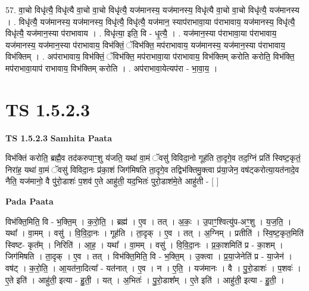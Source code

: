 \documentclass[17pt]{extarticle}
\begin{document}
57. वा॒चो विधृ॑त्यै॒ विधृ॑त्यै वा॒चो वा॒चो विधृ॑त्यै॒ यज॑मानस्य॒ यज॑मानस्य॒ विधृ॑त्यै वा॒चो वा॒चो विधृ॑त्यै॒ यज॑मानस्य । . विधृ॑त्यै॒ यज॑मानस्य॒ यज॑मानस्य॒ विधृ॑त्यै॒ विधृ॑त्यै॒ यज॑मान॒ स्याप॑राभावा॒या प॑राभावाय॒ यज॑मानस्य॒ विधृ॑त्यै॒ विधृ॑त्यै॒ यज॑मान॒स्या प॑राभावाय । . विधृ॑त्या॒ इति॒ वि - धृ॒त्यै॒ । . यज॑मान॒स्या प॑राभावा॒या प॑राभावाय॒ यज॑मानस्य॒ यज॑मान॒स्या प॑राभावाय॒ विभ॑क्तिं॒ ॅविभ॑क्ति॒ मप॑राभावाय॒ यज॑मानस्य॒ यज॑मान॒स्या प॑राभावाय॒ विभ॑क्तिम् । . अप॑राभावाय॒ विभ॑क्तिं॒ ॅविभ॑क्ति॒ मप॑राभावा॒या प॑राभावाय॒ विभ॑क्तिम् करोति करोति॒ विभ॑क्ति॒ मप॑राभावा॒याप॑ राभावाय॒ विभ॑क्तिम् करोति । . अप॑राभावा॒येत्यप॑रा - भा॒वा॒य॒ । \newline
\pagebreak
{}
\section*{ TS 1.5.2.3 }

\textbf{TS 1.5.2.3 } \newline
\textbf{Samhita Paata} \newline

विभ॑क्तिं करोति॒ ब्रह्मै॒व तद॑करुपाꣳ॒॒शु य॑जति॒ यथा॑ वा॒मं ॅवसु॑ विविदा॒नो गूह॑ति ता॒दृगे॒व तद॒ग्निं प्रति॑ स्विष्ट॒कृतं॒ निरा॑ह॒ यथा॑ वा॒मं ॅवसु॑ विविदा॒नः प्र॑का॒शं जिग॑मिषति ता॒दृगे॒व तद्विभ॑क्तिमु॒क्त्वा प्र॑या॒जेन॒ वष॑ट्करोत्या॒यत॑नादे॒व नैति॒ यज॑मानो॒ वै पु॑रो॒डाशः॑ प॒शव॑ ए॒ते आहु॑ती॒ यद॒भितः॑ पुरो॒डाश॑मे॒ते आहु॑ती - [ ] \newline

\textbf{Pada Paata} \newline

विभ॑क्ति॒मिति॒ वि - भ॒क्ति॒म् । क॒रो॒ति॒ । ब्रह्म॑ । ए॒व । तत् । अ॒कः॒ । उ॒पाꣳ॒॒श्वित्यु॑प-अꣳ॒॒शु । य॒ज॒ति॒ । यथा᳚ । वा॒मम् । वसु॑ । वि॒वि॒दा॒नः । गूह॑ति । ता॒दृक् । ए॒व । तत् । अ॒ग्निम् । प्रतीति॑ । स्वि॒ष्ट॒कृत॒मिति॑ स्विष्ट- कृत᳚म् । निरिति॑ । आ॒ह॒ । यथा᳚ । वा॒मम् । वसु॑ । वि॒वि॒दा॒नः । प्र॒का॒शमिति॑ प्र - का॒शम् । जिग॑मिषति । ता॒दृक् । ए॒व । तत् । विभ॑क्ति॒मिति॒ वि - भ॒क्ति॒म् । उ॒क्त्वा । प्र॒या॒जेनेति॑ प्र - या॒जेन॑ । वष॑ट् । क॒रो॒ति॒ । आ॒यत॑ना॒दित्या᳚ - यत॑नात् । ए॒व । न । ए॒ति॒ । यज॑मानः । वै । पु॒रो॒डाशः॑ । प॒शवः॑ । ए॒ते इति॑ । आहु॑ती॒ इत्या - हु॒ती॒ । यत् । अ॒भितः॑ । पु॒रो॒डाश᳚म् । ए॒ते इति॑ । आहु॑ती॒ इत्या - हु॒ती॒ ।  \newline
\end{document}
